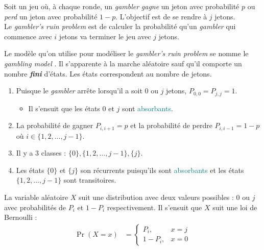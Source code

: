\documentclass[10pt, french]{article}
\begin{document}
\begin{multicols*}{2}
\begin{definitionNOHFILL}
Soit un jeu où, à chaque ronde, un \og \textit{gambler} \fg{} \textit{gagne} un jeton avec probabilité $p$ ou \textit{perd} un jeton avec probabilité $1 - p$. L'objectif est de se rendre à $j$ jetons.\\

Le \og \textit{gambler's ruin problem} \fg{} est de calculer la probabilité qu'un \og \textit{gambler} \fg{} qui commence avec $i$ jetons va terminer le jeu avec $j$ jetons.
\end{definitionNOHFILL}

\begin{definitionNOHFILLsub}
Le modèle qu'on utilise pour modéliser le \og \textit{gambler's ruin problem} \fg{} se nomme le \og \textit{gambling model} \fg{}. Il s'apparente à la marche aléatoire sauf qu'il comporte un nombre \textbf{\textit{fini}} d'états. Les états correspondent au nombre de jetons.\\

\begin{definitionNOHFILLpropos}
\begin{enumerate}[label = \circled{\arabic*}{trueblue}]
	\item	Puisque le \og \textit{gambler} \fg{} arrête lorsqu'il a soit $0$ ou $j$ jetons, $P_{0, 0} = P_{j, j} = 1$.
		\begin{itemize}
		\item	Il s'ensuit que les états $0$ et $j$ sont \textcolor{teal}{absorbants}.
		\end{itemize}
	\item	La probabilité de gagner $P_{i, i + 1} = p$ et la probabilité de perdre $P_{i, i - 1} = 1 - p$ où $i \in \{1, 2, \dots, j - 1\}$.
	\item	Il y a 3 classes : $\{0\}, \{1, 2, \dots, j - 1\}, \{j\}$.
	\item	Les états $\{0\}$ et $\{j\}$ son récurrents puisqu'ils sont \textcolor{teal}{absorbants} et les états $\{1, 2, \dots, j - 1\}$ sont transitoires.
\end{enumerate}
\end{definitionNOHFILLpropos}
\end{definitionNOHFILLsub}

\begin{definitionNOHFILLprop}
La variable aléatoire $X$ suit une distribution avec deux valeurs possibles : $0$ ou $j$ avec probabilités de $P_{i}$ et $1 - P_{i}$ respectivement. Il s'ensuit que $X$ suit une loi de Bernoulli : \\
\begin{align*}
	\Pr(X = x)
	&=	\begin{cases}
		P_{i},		&	x = j	\\
		1 - P_{i},	&	x = 0
	\end{cases}
\end{align*}


\end{definitionNOHFILLprop}
\end{multicols*}
\end{document}
